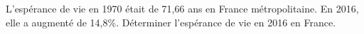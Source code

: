 
L'espérance de vie en 1970 était de 71,66 ans en France métropolitaine. En 2016, elle a augmenté de 14,8\%. Déterminer l'espérance de vie en 2016 en France.

 